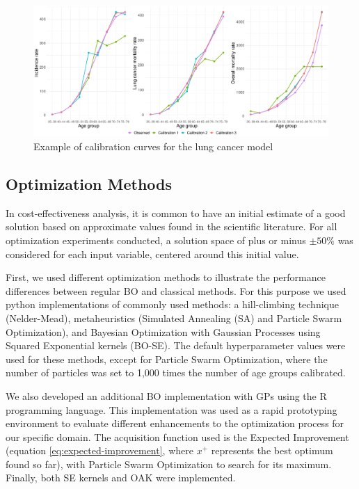 \documentclass[sn-mathphys,Numbered]{sn-jnl}%
\begin{document}
\begin{figure}[h!]
	\centering	
	\includegraphics[width=\textwidth]{figs/calibration-curves.pdf}		
	\caption{Example of calibration curves for the lung cancer model}	
	\label{fig:calibration-curve}	
\end{figure}

\subsection{Optimization Methods}
In cost-effectiveness analysis, it is common to have an initial estimate of a good solution based on approximate values found in the scientific literature. For all optimization experiments conducted, a solution space of plus or minus $\pm 50\%$ was considered for each input variable, centered around this initial value.

First, we used different optimization methods to illustrate the performance differences between regular BO and classical methods. For this purpose we used python implementations of commonly used methods: a hill-climbing technique (Nelder-Mead\cite{nelder-mead}), metaheuristics (Simulated Annealing (SA)\cite{simulated-annealing} and Particle Swarm Optimization\cite{pso}), and Bayesian Optimization with Gaussian Processes using Squared Exponential kernels (BO-SE). The default hyperparameter values were used for these methods, except for Particle Swarm Optimization, where the number of particles was set to 1,000 times the number of age groups calibrated.

We also developed an additional BO implementation with GPs using the R programming language. This implementation was used as a rapid prototyping environment to evaluate different enhancements to the optimization process for our specific domain. The acquisition function used is the Expected Improvement (equation \ref{eq:expected-improvement}, where $x^+$ represents the best optimum found so far), with Particle Swarm Optimization to search for its maximum. Finally, both SE kernels and OAK were implemented.
\end{document}
